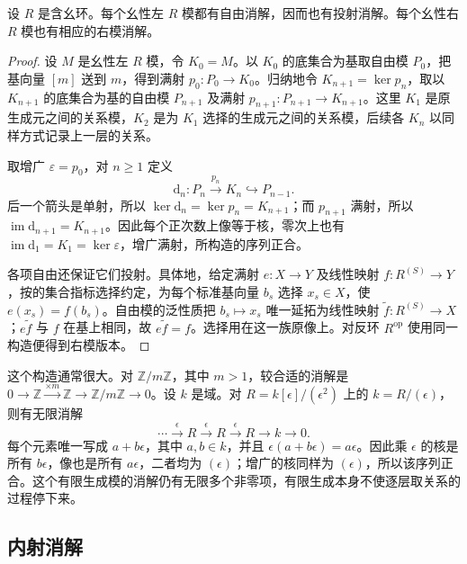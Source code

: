 \begin{proposition}\label{b4:prop:free-resolution-exists}
	设 \(R\) 是含幺环。每个幺性左 \(R\) 模都有自由消解，因而也有投射消解。每个幺性右 \(R\) 模也有相应的右模消解。
\end{proposition}
\begin{proof}
	设 \(M\) 是幺性左 \(R\) 模，令 \(K_0=M\)。以 \(K_0\) 的底集合为基取自由模 \(P_0\)，把基向量 \([m]\) 送到 \(m\)，得到满射 \(p_0:P_0\to K_0\)。归纳地令 \(K_{n+1}=\ker p_n\)，取以 \(K_{n+1}\) 的底集合为基的自由模 \(P_{n+1}\) 及满射 \(p_{n+1}:P_{n+1}\to K_{n+1}\)。这里 \(K_1\) 是原生成元之间的关系模，\(K_2\) 是为 \(K_1\) 选择的生成元之间的关系模，后续各 \(K_n\) 以同样方式记录上一层的关系。

	取增广 \(\varepsilon=p_0\)，对 \(n\ge1\) 定义
	\[
		\mathrm{d}_n:P_n\xrightarrow{p_n}K_n\hookrightarrow P_{n-1}.
	\]
	后一个箭头是单射，所以 \(\ker\mathrm{d}_n=\ker p_n=K_{n+1}\)；而 \(p_{n+1}\) 满射，所以 \(\operatorname{im}\mathrm{d}_{n+1}=K_{n+1}\)。因此每个正次数上像等于核，零次上也有 \(\operatorname{im}\mathrm{d}_1=K_1=\ker\varepsilon\)，增广满射，所构造的序列正合。

	各项自由还保证它们投射。具体地，给定满射 \(e:X\to Y\) 及线性映射 \(f:R^{(S)}\to Y\)，按的集合指标选择约定，为每个标准基向量 \(b_s\) 选择 \(x_s\in X\)，使 \(e(x_s)=f(b_s)\)。自由模的泛性质把 \(b_s\mapsto x_s\) 唯一延拓为线性映射 \(\widetilde f:R^{(S)}\to X\)；\(e\widetilde f\) 与 \(f\) 在基上相同，故 \(e\widetilde f=f\)。选择用在这一族原像上。对反环 \(R^{\mathrm{op}}\) 使用同一构造便得到右模版本。
\end{proof}

这个构造通常很大。对 \(\mathbb Z/m\mathbb Z\)，其中 \(m>1\)，较合适的消解是 \(0\to\mathbb Z\xrightarrow{\times m}\mathbb Z\to\mathbb Z/m\mathbb Z\to0\)。设 \(k\) 是域。对 \(R=k[\epsilon]/(\epsilon^2)\) 上的 \(k=R/(\epsilon)\)，则有无限消解
\[
	\cdots\xrightarrow{\epsilon}R\xrightarrow{\epsilon}R \xrightarrow{\epsilon}R\longrightarrow k\longrightarrow0.
\]
每个元素唯一写成 \(a+b\epsilon\)，其中 \(a,b\in k\)，并且 \(\epsilon(a+b\epsilon)=a\epsilon\)。因此乘 \(\epsilon\) 的核是所有 \(b\epsilon\)，像也是所有 \(a\epsilon\)，二者均为 \((\epsilon)\)；增广的核同样为 \((\epsilon)\)，所以该序列正合。这个有限生成模的消解仍有无限多个非零项，有限生成本身不使逐层取关系的过程停下来。

\subsection{内射消解}
\label{b4:subsec:0701:02}

